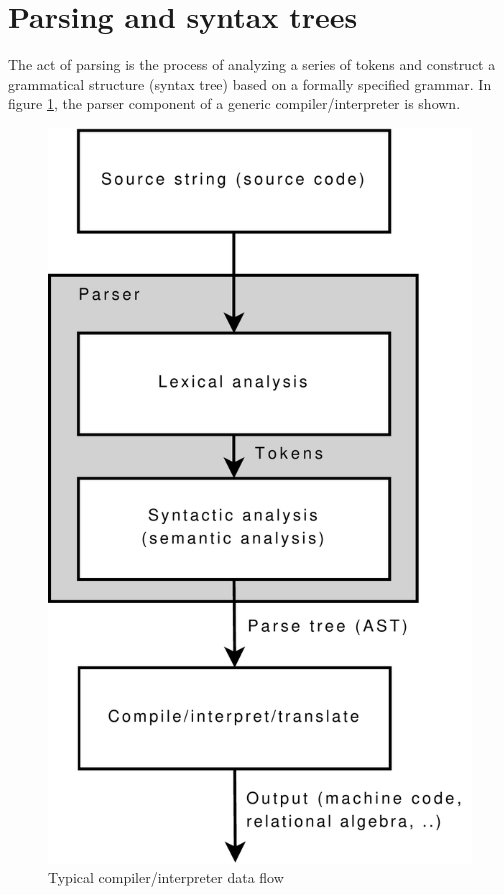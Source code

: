 \section{Parsing and syntax trees}
\label{sect:parser_and_syntaxtrees}
The act of parsing is the process of analyzing a series of tokens and construct
a grammatical structure (syntax tree) based on a formally specified grammar. In
figure \ref{figure:parser:overview}, the parser component of a generic
compiler/interpreter is shown. 

\begin{figure}[h]
  \centering
    \includegraphics[scale=0.40]{diagrams/parser_overview}
  \caption{Typical compiler/interpreter data flow}
  \label{figure:parser:overview}
\end{figure}

